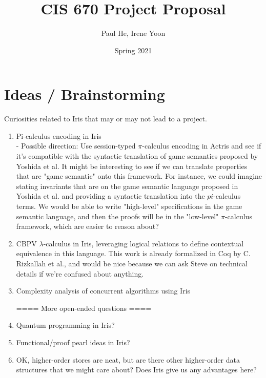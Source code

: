 \documentclass[11pt,twoside]{article}
\begin{document}
\title{CIS 670 Project Proposal}
\author{Paul He, Irene Yoon}
\date{Spring 2021}

\maketitle{}


\section{Ideas / Brainstorming}
Curiosities related to Iris that may or may not lead to a 
project.
\begin{enumerate} 
    \item Pi-calculus encoding in Iris \\
    - Possible direction: Use session-typed $\pi$-calculus encoding in Actris
    and see if it's compatible with the syntactic translation of game 
    semantics proposed by Yoshida et al. It might be interesting to see
    if we can translate properties that are "game semantic" onto this 
    framework.
    For instance, we could imagine stating invariants that are on the game 
    semantic language proposed in Yoshida et al. and providing a syntactic 
    translation into the $pi$-calculus terms. We would be able to write 
    "high-level" specifications in the game semantic language, and then
    the proofs will be in the "low-level" $\pi$-calculus framework, which
    are easier to reason about?
    \item CBPV $\lambda$-calculus in Iris, leveraging logical relations to
    define contextual equivalence in this language. This work is already 
    formalized in Coq by C. Rizkallah et al., and would be nice because
    we can ask Steve on technical details if we're confused about anything.
    \item Complexity analysis of concurrent algorithms using Iris

    ==== More open-ended questions ====
    \item Quantum programming in Iris?
    \item Functional/proof pearl ideas in Iris?
    \item OK, higher-order stores are neat, but are there other higher-order
    data structures that we might care about? Does Iris give us any
    advantages here? 
\end{enumerate}
\end{document}
